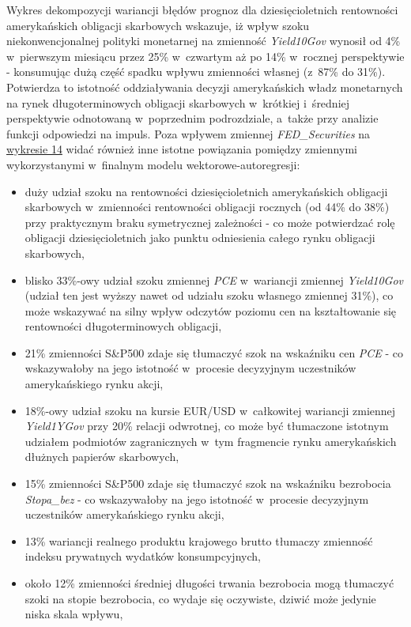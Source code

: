Wykres dekompozycji wariancji błędów prognoz dla dziesięcioletnich rentowności amerykańskich obligacji skarbowych wskazuje, iż wpływ szoku niekonwencjonalnej polityki monetarnej na zmienność \textit{Yield10Gov} wynosił od 4\% w~pierwszym miesiącu przez 25\% w~czwartym aż po 14\% w~rocznej perspektywie - konsumując dużą część spadku wpływu zmienności własnej (z~87\% do 31\%). Potwierdza to istotność oddziaływania decyzji amerykańskich władz monetarnych na rynek długoterminowych obligacji skarbowych w~krótkiej i~średniej perspektywie odnotowaną w~poprzednim podrozdziale, a~także przy analizie funkcji odpowiedzi na impuls. Poza wpływem zmiennej \textit{FED_Securities} na \hyperlink{fig15}{wykresie 14} widać również inne istotne powiązania pomiędzy zmiennymi wykorzystanymi w~finalnym modelu wektorowe-autoregresji:
\begin{itemize}
\setlength\itemsep{0.05cm}
\item duży udział szoku na rentowności dziesięcioletnich amerykańskich obligacji skarbowych w~zmienności rentowności obligacji rocznych (od 44\% do 38\%) przy praktycznym braku symetrycznej zależności - co może potwierdzać rolę obligacji dziesięcioletnich jako punktu odniesienia całego rynku obligacji skarbowych,
\item blisko 33\%-owy udział szoku zmiennej \textit{PCE} w~wariancji zmiennej \textit{Yield10Gov} (udział ten jest wyższy nawet od udziału szoku własnego zmiennej 31\%), co może wskazywać na silny wpływ odczytów poziomu cen na kształtowanie się rentowności długoterminowych obligacji,
\item 21\% zmienności S\&P500 zdaje się tłumaczyć szok na wskaźniku cen \textit{PCE} - co wskazywałoby na jego istotność w~procesie decyzyjnym uczestników amerykańskiego rynku akcji,
\item 18\%-owy udział szoku na kursie EUR/USD w~całkowitej wariancji zmiennej \textit{Yield1YGov} przy 20\% relacji odwrotnej, co może być tłumaczone istotnym udziałem podmiotów zagranicznych w~tym fragmencie rynku amerykańskich dłużnych papierów skarbowych,
\item 15\% zmienności S\&P500 zdaje się tłumaczyć szok na wskaźniku bezrobocia \textit{Stopa_bez} - co wskazywałoby na jego istotność w~procesie decyzyjnym uczestników amerykańskiego rynku akcji,
\item 13\% wariancji realnego produktu krajowego brutto tłumaczy zmienność indeksu prywatnych wydatków konsumpcyjnych,
\item około 12\% zmienności średniej długości trwania bezrobocia mogą tłumaczyć szoki na stopie bezrobocia, co wydaje się oczywiste, dziwić może jedynie niska skala wpływu,

\end{itemize}
